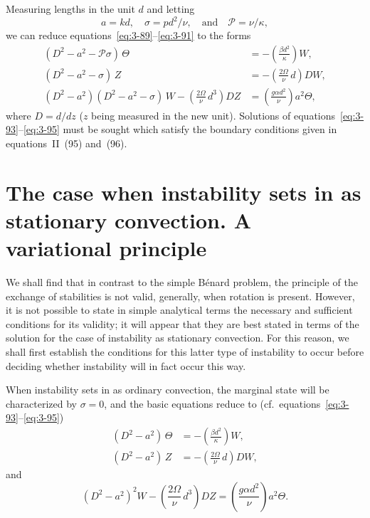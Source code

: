 Measuring lengths in the unit $d$ and letting
\begin{equation}\label{eq:3-92}
a = kd, \quad \sigma = pd^2/\nu, \quad \text{and} \quad \mathscr{P} = \nu/\kappa,
\end{equation}
we can reduce equations~\eqref{eq:3-89}--\eqref{eq:3-91} to the forms
\begin{align}
(D^2 - a^2 - \mathscr{P}\sigma)\,\Theta &= -\left(\frac{\beta d^2}{\kappa}\right)\!W, \label{eq:3-93}\\[4pt]
(D^2 - a^2 - \sigma)\,Z &= -\left(\frac{2\Omega}{\nu}\,d\right)\!DW, \label{eq:3-94}\\[4pt]
(D^2 - a^2)(D^2 - a^2 - \sigma)\,W - \left(\frac{2\Omega}{\nu}\,d^3\right)\!DZ &= \left(\frac{g\alpha d^2}{\nu}\right)\!a^2\Theta, \label{eq:3-95}
\end{align}
where $D = d/dz$ ($z$ being measured in the new unit). Solutions of equations~\eqref{eq:3-93}--\eqref{eq:3-95} must be sought which satisfy the boundary conditions given in equations~II~(95) and~(96).

\section{The case when instability sets in as stationary convection. A variational principle}\label{sec:3-26}

We shall find that in contrast to the simple B\'enard problem, the principle of the exchange of stabilities is not valid, generally, when rotation is present. However, it is not possible to state in simple analytical terms the necessary and sufficient conditions for its validity; it will appear that they are best stated in terms of the solution for the case of instability as stationary convection. For this reason, we shall first establish the conditions for this latter type of instability to occur before deciding whether instability will in fact occur this way.

When instability sets in as ordinary convection, the marginal state will be characterized by $\sigma = 0$, and the basic equations reduce to (cf.\ equations~\eqref{eq:3-93}--\eqref{eq:3-95})
\begin{align}
(D^2 - a^2)\,\Theta &= -\left(\frac{\beta d^2}{\kappa}\right)\!W, \label{eq:3-96}\\[4pt]
(D^2 - a^2)\,Z &= -\left(\frac{2\Omega}{\nu}\,d\right)\!DW, \label{eq:3-97}
\end{align}
and
\begin{equation}\label{eq:3-98}
(D^2 - a^2)^2 W - \left(\frac{2\Omega}{\nu}\,d^3\right)\!DZ = \left(\frac{g\alpha d^2}{\nu}\right)\!a^2\Theta.
\end{equation}

